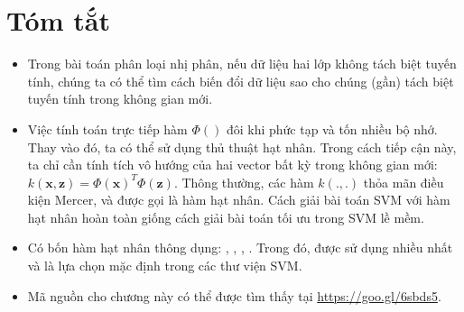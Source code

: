 \section{Tóm tắt }

\begin{itemize}
\item Trong bài toán phân loại nhị phân, nếu dữ liệu hai lớp {không tách biệt tuyến tính}, chúng ta có thể tìm cách biến đổi dữ liệu sao cho chúng (gần) tách biệt tuyến tính trong không gian mới.

\item Việc tính toán trực tiếp hàm $\Phi()$ đôi khi phức tạp và tốn nhiều bộ nhớ. Thay vào đó, ta có thể sử dụng thủ thuật hạt nhân. Trong cách tiếp cận này, ta chỉ cần tính tích vô hướng của hai vector bất kỳ trong không gian mới: $k(\mathbf{x}, \mathbf{z}) = \Phi(\mathbf{x})^T\Phi(\mathbf{z})$.
Thông thường, các hàm $k(., .)$ thỏa mãn điều kiện Mercer, và được
gọi là hàm hạt nhân. Cách giải bài toán SVM với hàm hạt nhân hoàn toàn giống cách giải bài toán tối ưu trong SVM lề mềm.

\item Có bốn hàm hạt nhân thông dụng: ,
, , . Trong đó,  được sử dụng nhiều nhất và là lựa chọn mặc định trong các thư viện SVM.

\item Mã nguồn cho chương này có thể được tìm thấy tại \url{https://goo.gl/6sbds5}.

\end{itemize}







